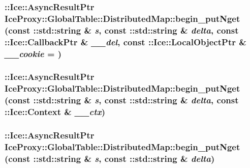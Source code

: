 \label{class_ice_proxy_1_1_global_table_1_1_distributed_map_ac3143fd6a6c05e877f1e47ce77e2a327}
\hypertarget{class_ice_proxy_1_1_global_table_1_1_distributed_map_ab85a6bb537235d32e07b372b0356c828}{
\subsubsection[{begin\_\-putNget}]{\setlength{\rightskip}{0pt plus 5cm}::Ice::AsyncResultPtr IceProxy::GlobalTable::DistributedMap::begin\_\-putNget (const ::std::string \& {\em s}, \/  const ::std::string \& {\em delta}, \/  const ::Ice::CallbackPtr \& {\em \_\-\_\-del}, \/  const ::Ice::LocalObjectPtr \& {\em \_\-\_\-cookie} = {})}}
\label{class_ice_proxy_1_1_global_table_1_1_distributed_map_ab85a6bb537235d32e07b372b0356c828}
\hypertarget{class_ice_proxy_1_1_global_table_1_1_distributed_map_a4f968779db74bb7b468f6e859cb1aed3}{
\subsubsection[{begin\_\-putNget}]{\setlength{\rightskip}{0pt plus 5cm}::Ice::AsyncResultPtr IceProxy::GlobalTable::DistributedMap::begin\_\-putNget (const ::std::string \& {\em s}, \/  const ::std::string \& {\em delta}, \/  const ::Ice::Context \& {\em \_\-\_\-ctx})}}
\label{class_ice_proxy_1_1_global_table_1_1_distributed_map_a4f968779db74bb7b468f6e859cb1aed3}
\hypertarget{class_ice_proxy_1_1_global_table_1_1_distributed_map_a2ce9fb426f365390f7b3befb0e77bdbb}{
\subsubsection[{begin\_\-putNget}]{\setlength{\rightskip}{0pt plus 5cm}::Ice::AsyncResultPtr IceProxy::GlobalTable::DistributedMap::begin\_\-putNget (const ::std::string \& {\em s}, \/  const ::std::string \& {\em delta})}}
